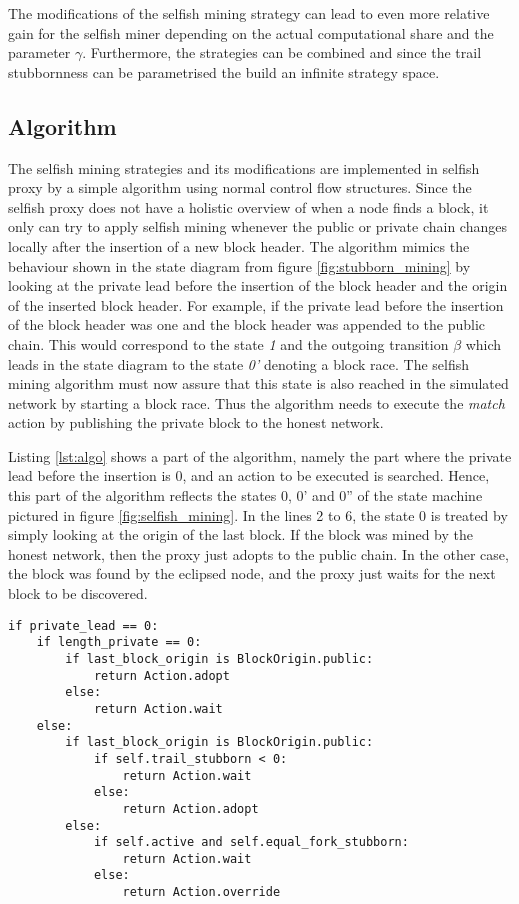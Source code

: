The modifications of the selfish mining strategy can lead to even more relative gain for the selfish miner depending on the actual computational share and the parameter $\gamma$.
Furthermore, the strategies can be combined and since the trail stubbornness can be parametrised the build an infinite strategy space.

\subsection{Algorithm}

The selfish mining strategies and its modifications are implemented in selfish proxy by a simple algorithm using normal control flow structures.
Since the selfish proxy does not have a holistic overview of when a node finds a block, it only can try to apply selfish mining whenever the public or private chain changes locally after the insertion of a new block header.
The algorithm mimics the behaviour shown in the state diagram from figure \ref{fig:stubborn_mining} by looking at the private lead before the insertion of the block header and the origin of the inserted block header.
For example, if the private lead before the insertion of the block header was one and the block header was appended to the public chain.
This would correspond to the state \textit{1} and the outgoing transition $\beta$ which leads in the state diagram to the state \textit{0'} denoting a block race.
The selfish mining algorithm must now assure that this state is also reached in the simulated network by starting a block race.
Thus the algorithm needs to execute the \textit{match} action by publishing the private block to the honest network.

Listing \ref{lst:algo} shows a part of the algorithm, namely the part where the private lead before the insertion is 0, and an action to be executed is searched.
Hence, this part of the algorithm reflects the states 0, 0' and 0'' of the state machine pictured in figure \ref{fig:selfish_mining}.
In the lines 2 to 6, the state 0 is treated by simply looking at the origin of the last block.
If the block was mined by the honest network, then the proxy just adopts to the public chain.
In the other case, the block was found by the eclipsed node, and the proxy just waits for the next block to be discovered.

\begin{minipage}{\linewidth}
\begin{lstlisting}[caption=Part of the selfish mining algorithm where private lead is zero, label={lst:algo}, basicstyle=\ttfamily, captionpos=b]
if private_lead == 0:
    if length_private == 0:
        if last_block_origin is BlockOrigin.public:
            return Action.adopt
        else:
            return Action.wait
    else:
        if last_block_origin is BlockOrigin.public:
            if self.trail_stubborn < 0:
                return Action.wait
            else:
                return Action.adopt
        else:
            if self.active and self.equal_fork_stubborn:
                return Action.wait
            else:
                return Action.override
\end{lstlisting}
\end{minipage}

